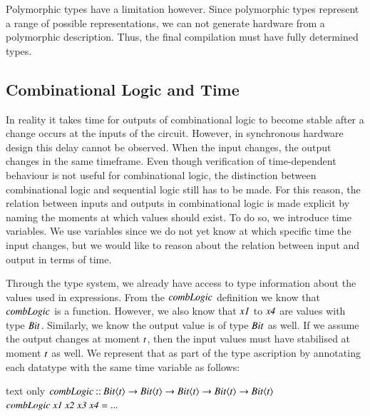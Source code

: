 Polymorphic types have a limitation however.
Since polymorphic types represent a range of possible representations, we can not generate hardware from a polymorphic description.
Thus, the final compilation must have fully determined types.

\subsection{Combinational Logic and Time}
In reality it takes time for outputs of combinational logic to become stable after a change occurs at the inputs of the circuit.
However, in synchronous hardware design this delay cannot be observed.
When the input changes, the output changes in the same timeframe.
Even though verification of time-dependent behaviour is not useful for combinational logic, the distinction between combinational logic and sequential logic still has to be made.
For this reason, the relation between inputs and outputs in combinational logic is made explicit by naming the moments at which values should exist.
To do so, we introduce time variables.
We use variables since we do not yet know at which specific time the input changes, but we would like to reason about the relation between input and output in terms of time.

Through the type system, we already have access to type information about the values used in expressions.
From the \ensuremath{\Varid{combLogic}} definition we know that \ensuremath{\Varid{combLogic}} is a function.
However, we also know that \ensuremath{\Varid{x1}} to \ensuremath{\Varid{x4}} are values with type \ensuremath{\Conid{Bit}}.
Similarly, we know the output value is of type \ensuremath{\Conid{Bit}} as well.
If we assume the output changes at moment \ensuremath{\Varid{t}}, then the input values must have stabilised at moment \ensuremath{\Varid{t}} as well.
We represent that as part of the type ascription by annotating each datatype with the same time variable as follows:
\begin{changemargin}{1cm}{0cm}
\begin{expansionno}{text only}
\ensuremath{\Varid{combLogic}\mathbin{::}\Conid{Bit}\langle\Varid{t}\rangle\to \Conid{Bit}\langle\Varid{t}\rangle\to \Conid{Bit}\langle\Varid{t}\rangle\to \Conid{Bit}\langle\Varid{t}\rangle\to \Conid{Bit}\langle\Varid{t}\rangle}
\ensuremath{\Varid{combLogic}\;\Varid{x1}\;\Varid{x2}\;\Varid{x3}\;\Varid{x4}\mathrel{=}\mathbin{...}}
\end{expansionno}
\end{changemargin}


